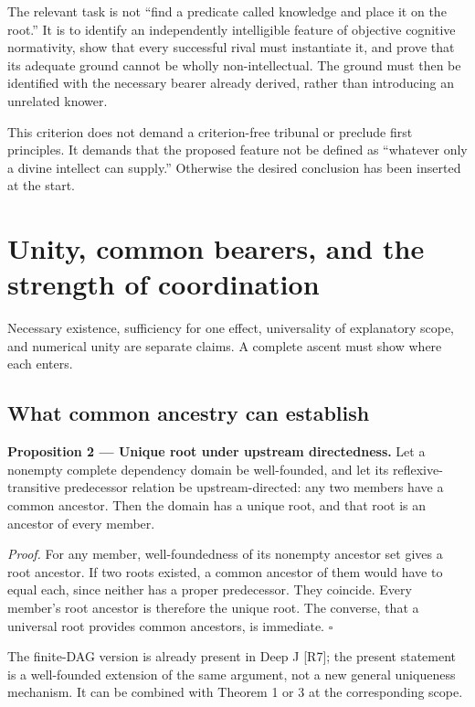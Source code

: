 \documentclass[11pt,a4paper]{article}
\begin{document}
The relevant task is not ``find a predicate called knowledge and place
it on the root.'' It is to identify an independently intelligible
feature of objective cognitive normativity, show that every successful
rival must instantiate it, and prove that its adequate ground cannot be
wholly non-intellectual. The ground must then be identified with the
necessary bearer already derived, rather than introducing an unrelated
knower.

This criterion does not demand a criterion-free tribunal or preclude
first principles. It demands that the proposed feature not be defined as
``whatever only a divine intellect can supply.'' Otherwise the desired
conclusion has been inserted at the start.

\section{Unity, common bearers, and the strength of
coordination}\label{unity-common-bearers-and-the-strength-of-coordination}

Necessary existence, sufficiency for one effect, universality of
explanatory scope, and numerical unity are separate claims. A complete
ascent must show where each enters.

\subsection{What common ancestry can
establish}\label{what-common-ancestry-can-establish}


\textbf{Proposition 2 --- Unique root under upstream directedness.} Let
a nonempty complete dependency domain be well-founded, and let its
reflexive-transitive predecessor relation be upstream-directed: any two
members have a common ancestor. Then the domain has a unique root, and
that root is an ancestor of every member.

\emph{Proof.} For any member, well-foundedness of its nonempty ancestor
set gives a root ancestor. If two roots existed, a common ancestor of
them would have to equal each, since neither has a proper predecessor.
They coincide. Every member's root ancestor is therefore the unique
root. The converse, that a universal root provides common ancestors, is
immediate. \(\square\)

The finite-DAG version is already present in Deep J {[}R7{]}; the
present statement is a well-founded extension of the same argument, not
a new general uniqueness mechanism. It can be combined with Theorem 1 or
3 at the corresponding scope.
\end{document}
